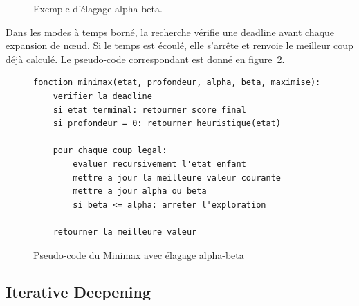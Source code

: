 \documentclass[a4paper]{article}
\begin{document}
\begin{figure}[H]
  \centering
  \caption{Exemple d'élagage alpha-beta.}
  \label{fig:alpha-beta-tree}
\end{figure}

Dans les modes à temps borné, la recherche vérifie une deadline avant chaque
expansion de nœud. Si le temps est écoulé, elle s'arrête et renvoie le meilleur
coup déjà calculé. Le pseudo-code correspondant est donné en
figure~\ref{fig:minimax-pseudocode}.

\begin{figure}[H]
{\small
\begin{verbatim}
fonction minimax(etat, profondeur, alpha, beta, maximise):
    verifier la deadline
    si etat terminal: retourner score final
    si profondeur = 0: retourner heuristique(etat)

    pour chaque coup legal:
        evaluer recursivement l'etat enfant
        mettre a jour la meilleure valeur courante
        mettre a jour alpha ou beta
        si beta <= alpha: arreter l'exploration

    retourner la meilleure valeur
\end{verbatim}
}
\caption{Pseudo-code du Minimax avec élagage alpha-beta}
\label{fig:minimax-pseudocode}
\end{figure}

\subsection{Iterative Deepening}
\end{document}
